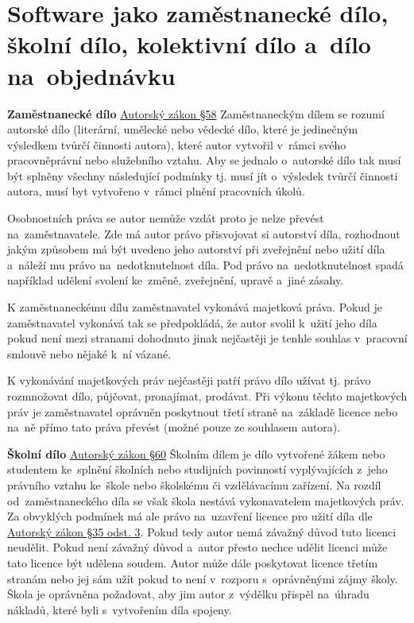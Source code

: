 \clearpage
\section{Software jako zaměstnanecké dílo, školní dílo, kolektivní dílo a~dílo na~objednávku}

\textbf{Zaměstnanecké dílo} \href{https://www.zakonyprolidi.cz/cs/2000-121#p58}{Autorský zákon §58}
Zaměstnaneckým dílem se rozumí autorské dílo (literární, umělecké nebo vědecké dílo, které je jedinečným výsledkem tvůrčí činnosti autora), které autor vytvořil v~rámci svého pracovněprávní nebo služebního vztahu. Aby se jednalo o~autorské dílo tak musí být splněny všechny následující podmínky tj. musí jít o~výsledek tvůrčí činnosti autora, musí byt vytvořeno v~rámci plnění pracovních úkolů.

Osobnostních práva se autor nemůže vzdát proto je nelze převést na~zaměstnavatele. Zde má autor právo přisvojovat si autorství díla, rozhodnout jakým způsobem má být uvedeno jeho autorství při zveřejnění nebo užití díla a~náleží mu právo na~nedotknutelnost díla. Pod právo na~nedotknutelnost spadá například udělení svolení ke~změně, zveřejnění, upravě a~jiné zásahy.

K zaměstnaneckému dílu zaměstnavatel vykonává majetková práva. Pokud je zaměstnavatel vykonává tak se předpokládá, že autor svolil k~užití jeho díla pokud není mezi stranami dohodnuto jinak nejčastěji je tenhle souhlas v~pracovní smlouvě nebo nějaké k~ní vázané.

K vykonávání majetkových práv nejčastěji patří právo dílo užívat tj. právo rozmnožovat dílo, půjčovat, pronajímat, prodávat. Při výkonu těchto majetkových práv je zaměstnavatel oprávněn poskytnout třetí straně na~základě licence nebo na~ně přímo tato práva převést (možné pouze ze souhlasem autora).

\vspace{0.3cm}
\textbf{Školní dílo} \href{https://www.zakonyprolidi.cz/cs/2000-121#p60}{Autorský zákon §60}
Školním dílem je dílo vytvořené žákem nebo studentem ke~splnění školních nebo studijních povinností vyplývajících z~jeho právního vztahu ke~škole nebo školskému či vzdělávacímu zařízení. Na rozdíl od~zaměstnaneckého díla se však škola nestává vykonavatelem majetkových práv. Za obvyklých podmínek má ale právo na~uzavření licence pro užití díla dle \href{https://www.zakonyprolidi.cz/cs/2000-121#p35-3}{Autorský zákon §35 odst. 3}. Pokud tedy autor nemá závažný důvod tuto licenci neudělit. Pokud není závažný důvod a~autor přesto nechce udělit licenci může tato licence být udělena soudem. Autor může dále poskytovat licence třetím stranám nebo jej sám užít pokud to není v~rozporu s~oprávněnými zájmy školy. Škola je oprávněna požadovat, aby jim autor z~výdělku přispěl na~úhradu nákladů, které byli s~vytvořením díla spojeny.

